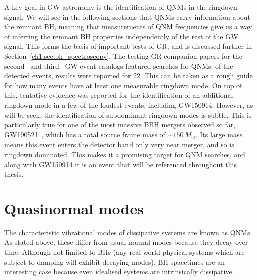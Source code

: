 A key goal in GW astronomy is the identification of QNMs in the ringdown signal.
We will see in the following sections that QNMs carry information about the remnant BH, meaning that measurements of QNM frequencies give us a way of inferring the remnant BH properties independently of the rest of the GW signal.
This forms the basis of important tests of GR, and is discussed further in Section~\ref{ch1:sec:bh_spectroscopy}.
The testing-GR companion papers for the second~\cite{LIGOScientific:2020tif} and third~\cite{LIGOScientific:2021sio} GW event catalogs featured searches for QNMs; of the detected events, results were reported for 22.
This can be taken as a rough guide for how many events have at least one measurable ringdown mode.
On top of this, tentative evidence was reported for the identification of an additional ringdown mode in a few of the loudest events, including GW150914.
However, as will be seen, the identification of subdominant ringdown modes is subtle.
This is particularly true for one of the most massive BBH mergers observed so far, GW190521~\cite{LIGOScientific:2020iuh}, which has a total source frame mass of $\sim 150\,M_\odot$.
Its large mass means this event enters the detector band only very near merger, and so is ringdown dominated.
This makes it a promising target for QNM searches, and along with GW150914 it is an event that will be referenced throughout this thesis. 



\section{Quasinormal modes}
\label{ch1:sec:qnms}

The characteristic vibrational modes of dissipative systems are known as QNMs.
As stated above, these differ from usual normal modes because they decay over time.
Although not limited to BHs (any real-world physical systems which are subject to damping will exhibit decaying modes), BH spacetimes are an interesting case because even idealised systems are intrinsically dissipative. 

